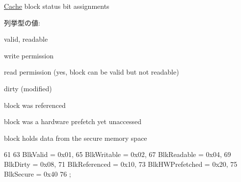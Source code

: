 \hyperlink{classCache}{Cache} block status bit assignments \begin{Desc}
\item[列挙型の値: ]\par
\begin{description}
\item[{\em 
\hypertarget{blk_8hh_aba0f973471df5d3edb783ecd63fe51f7acd687680ed8ee756c990233bd44ccc7a}{
BlkValid}
\label{blk_8hh_aba0f973471df5d3edb783ecd63fe51f7acd687680ed8ee756c990233bd44ccc7a}
}]valid, readable \item[{\em 
\hypertarget{blk_8hh_aba0f973471df5d3edb783ecd63fe51f7a202d95c1090db0082a7a954856ad5358}{
BlkWritable}
\label{blk_8hh_aba0f973471df5d3edb783ecd63fe51f7a202d95c1090db0082a7a954856ad5358}
}]write permission \item[{\em 
\hypertarget{blk_8hh_aba0f973471df5d3edb783ecd63fe51f7ac413eacf0a0c4c85665e24fc3138ad50}{
BlkReadable}
\label{blk_8hh_aba0f973471df5d3edb783ecd63fe51f7ac413eacf0a0c4c85665e24fc3138ad50}
}]read permission (yes, block can be valid but not readable) \item[{\em 
\hypertarget{blk_8hh_aba0f973471df5d3edb783ecd63fe51f7a87715983fd384f5ee41ec0608f5c6e5f}{
BlkDirty}
\label{blk_8hh_aba0f973471df5d3edb783ecd63fe51f7a87715983fd384f5ee41ec0608f5c6e5f}
}]dirty (modified) \item[{\em 
\hypertarget{blk_8hh_aba0f973471df5d3edb783ecd63fe51f7a7e0b581effa187d2825060c7b8dc714d}{
BlkReferenced}
\label{blk_8hh_aba0f973471df5d3edb783ecd63fe51f7a7e0b581effa187d2825060c7b8dc714d}
}]block was referenced \item[{\em 
\hypertarget{blk_8hh_aba0f973471df5d3edb783ecd63fe51f7aa64aeb976bf10b41a7c383f0035f753b}{
BlkHWPrefetched}
\label{blk_8hh_aba0f973471df5d3edb783ecd63fe51f7aa64aeb976bf10b41a7c383f0035f753b}
}]block was a hardware prefetch yet unaccessed \item[{\em 
\hypertarget{blk_8hh_aba0f973471df5d3edb783ecd63fe51f7ae61b87ec40871a2ddb384c14fc1e46e2}{
BlkSecure}
\label{blk_8hh_aba0f973471df5d3edb783ecd63fe51f7ae61b87ec40871a2ddb384c14fc1e46e2}
}]block holds data from the secure memory space \end{description}
\end{Desc}




\begin{DoxyCode}
61                         {
63     BlkValid =          0x01,
65     BlkWritable =       0x02,
67     BlkReadable =       0x04,
69     BlkDirty =          0x08,
71     BlkReferenced =     0x10,
73     BlkHWPrefetched =   0x20,
75     BlkSecure =         0x40
76 };
\end{DoxyCode}
